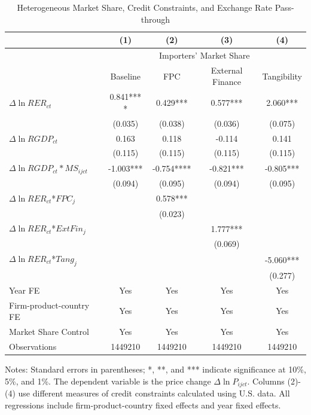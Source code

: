 \documentclass[12pt]{article}
\begin{document}
\begin{table}[htbp]
	\centering
	\caption{Heterogeneous Market Share, Credit Constraints, and Exchange Rate Pass-through}
	\begin{threeparttable}
		\begin{tabular}{lcccc}
			\toprule
			& (1)   & (2)   & (3)   & (4) \\
			\midrule
			& \multicolumn{4}{c}{Importers' Market Share}  \\
			&  Baseline     & FPC & External Finance& Tangibility        \\
			\midrule
			$\Delta \ln RER_{ct}$ & 0.841*** * & 0.429*** & 0.577*** & 2.060*** \\
			& (0.035) & (0.038) & (0.036) & (0.075) \\
			$\Delta \ln RGDP_{ct}$ & 0.163 & 0.118 & -0.114 & 0.141\\
			& (0.115) & (0.115) & (0.115) & (0.115) \\
			$\Delta \ln RGDP_{ct}*MS_{ijct}$ & -1.003***  & -0.754**** & -0.821*** & -0.805*** \\
			& (0.094) & (0.095) & (0.094) & (0.095) \\
			$\Delta \ln RER_{ct}$*$FPC_{j}$ &   & 0.578*** &       &  \\
			&       & (0.023) &       &  \\
			$\Delta \ln RER_{ct}$*$ExtFin_{j}$ &       &       & 1.777*** &  \\
			&      &       & (0.069) &  \\
			$\Delta \ln RER_{ct}$*$Tang_{j}$ &       &       &       & -5.060*** \\
			&       &       &       & (0.277) \\
			Year FE  & Yes  & Yes   & Yes   & Yes \\
			Firm-product-country FE & Yes    & Yes   & Yes   & Yes \\
			Market Share Control & Yes   & Yes   & Yes   & Yes \\
			Observations & 1449210  & 1449210 & 1449210 & 1449210 \\
			\bottomrule
		\end{tabular}
		\begin{tablenotes}
			\footnotesize
			\item[Notes:] Standard errors in parentheses; *, **, and *** indicate significance at 10\%, 5\%, and 1\%. The dependent variable is the price change $\Delta \ln P_{ijct}$. Columns (2)-(4) use different measures of credit constraints calculated using U.S. data. All regressions include firm-product-country fixed effects and year fixed effects.
		\end{tablenotes}
	\end{threeparttable}
	\label{tab.share}
\end{table}
\end{document}
